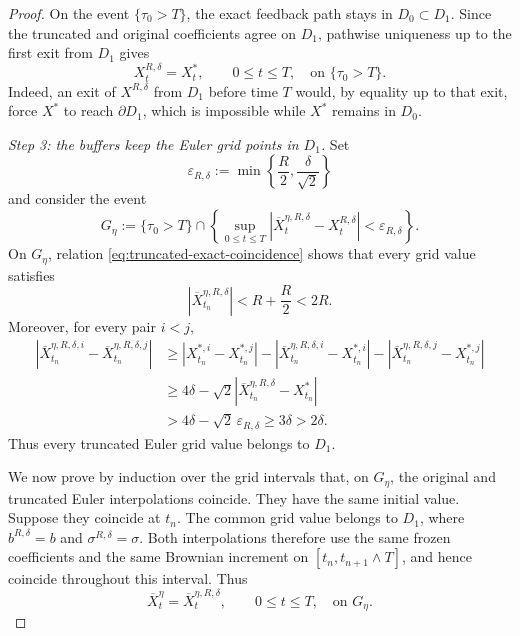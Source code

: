 \documentclass[11pt]{article}
\theoremstyle{definition}
\theoremstyle{remark}
\numberwithin{equation}{section}
\begin{document}
\begin{proof}
On the event $\{\tau_0>T\}$, the exact feedback path stays in $D_0\subset D_1$.  Since the
truncated and original coefficients agree on $D_1$, pathwise uniqueness up to the first exit from
$D_1$ gives
\begin{equation}\label{eq:truncated-exact-coincidence}
 X_t^{R,\delta}=X_t^*,
 \qquad0\le t\le T,
 \quad\text{on }\{\tau_0>T\}.
\end{equation}
Indeed, an exit of $X^{R,\delta}$ from $D_1$ before time $T$ would, by equality up to that exit,
force $X^*$ to reach $\partial D_1$, which is impossible while $X^*$ remains in $D_0$.

\smallskip
\noindent\textit{Step 3: the buffers keep the Euler grid points in $D_1$.}
Set
\begin{equation}\label{eq:euler-buffer}
 \varepsilon_{R,\delta}:=
 \min\left\{\frac R2,\frac{\delta}{\sqrt2}\right\}
\end{equation}
and consider the event
\begin{equation}\label{eq:euler-good-event}
 G_\eta:=\{\tau_0>T\}\cap
 \left\{
 \sup_{0\le t\le T}
 |\overline X_t^{\eta,R,\delta}-X_t^{R,\delta}|
 <\varepsilon_{R,\delta}
 \right\}.
\end{equation}
On $G_\eta$, relation \eqref{eq:truncated-exact-coincidence} shows that every grid value satisfies
\[
 |\overline X_{t_n}^{\eta,R,\delta}|
 <R+\frac R2<2R.
\]
Moreover, for every pair $i<j$,
\begin{align*}
 |\overline X_{t_n}^{\eta,R,\delta,i}
   -\overline X_{t_n}^{\eta,R,\delta,j}|
 &\ge |X_{t_n}^{*,i}-X_{t_n}^{*,j}|
   -|\overline X_{t_n}^{\eta,R,\delta,i}-X_{t_n}^{*,i}|
   -|\overline X_{t_n}^{\eta,R,\delta,j}-X_{t_n}^{*,j}|\\
 &\ge4\delta-\sqrt2
 |\overline X_{t_n}^{\eta,R,\delta}-X_{t_n}^*|\\
 &>4\delta-\sqrt2\,\varepsilon_{R,\delta}
 \ge3\delta>2\delta.
\end{align*}
Thus every truncated Euler grid value belongs to $D_1$.

We now prove by induction over the grid intervals that, on $G_\eta$, the original and truncated Euler
interpolations coincide.  They have the same initial value.  Suppose they coincide at $t_n$.  The
common grid value belongs to $D_1$, where $b^{R,\delta}=b$ and
$\sigma^{R,\delta}=\sigma$.  Both interpolations therefore use the same frozen coefficients and the
same Brownian increment on $[t_n,t_{n+1}\wedge T]$, and hence coincide throughout this interval.
Thus
\begin{equation}\label{eq:Euler-original-truncated-coincidence}
 \overline X_t^\eta=\overline X_t^{\eta,R,\delta},
 \qquad0\le t\le T,
 \quad\text{on }G_\eta.
\end{equation}


\end{proof}
\end{document}
